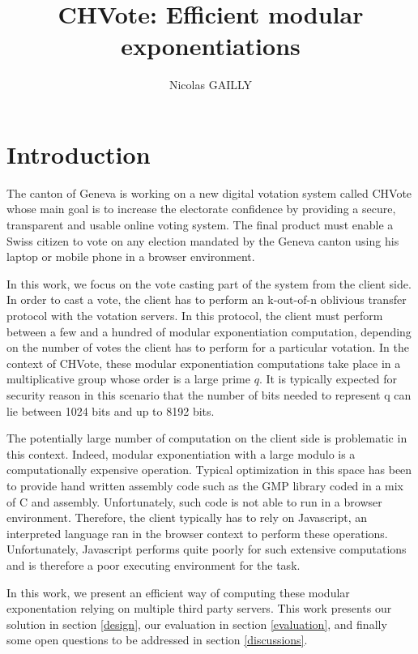 \documentclass[]{article}
\title{CHVote: Efficient modular exponentiations}
\author{Nicolas GAILLY}
\begin{document}
\maketitle

\section{Introduction} \label{intro}

The canton of Geneva is working on a new digital votation system called
CHVote \cite{chvote} whose main goal is to increase the electorate confidence 
by providing a secure, transparent and usable online voting system. The final
product must enable a Swiss citizen to vote on any election mandated by the
Geneva canton using his laptop or mobile phone in a browser environment.

In this work, we focus on the vote casting part of the system from the client
side. In order to cast a vote, the client has to perform an k-out-of-n oblivious
transfer protocol \cite{chu2005} with the votation servers. In this protocol,
the client must perform between a few and a hundred of modular exponentiation
computation, depending on the number of votes the client has to perform for a
particular votation. In the context of CHVote, these modular exponentiation
computations take place in a multiplicative group whose order is a large prime
$q$. It is typically expected for security reason in this scenario that the number
of bits needed to represent q can lie between 1024 bits and up to 8192 bits.

The potentially large number of computation on the client side is problematic in
this context.  Indeed, modular exponentiation with a large modulo is a
computationally expensive operation. Typical optimization in this space has been
to provide hand written assembly code such as the GMP library \cite{gmplib}
coded in a mix of C and assembly. Unfortunately, such code is not able to run in
a browser environment. Therefore, the client typically has to rely on
Javascript, an interpreted language ran in the browser context to perform these
operations.  Unfortunately, Javascript performs quite poorly for such extensive
computations \cite{jsbad} and is therefore a poor executing environment for the
task.

In this work, we present an efficient way of computing these modular
exponentation relying on multiple third party servers. This work presents our
solution in section \ref{design}, our evaluation in section \ref{evaluation},
and finally some open questions to be addressed in section \ref{discussions}.
\end{document}
